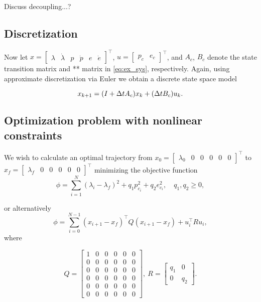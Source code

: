 Discuss decoupling...?

\subsection{Discretization}
Now let $x = \begin{bmatrix}\lambda&\dot{\lambda}&p&\dot{p}&e&\dot{e}\end{bmatrix}^\top$, $u = \begin{bmatrix}p_c&e_c\end{bmatrix}^\top$, and $A_c$, $B_c$ denote the state transition matrix and ** matrix in \eqref{eq:ex_sys}, respectively. Again, using approximate discretization via Euler we obtain a discrete state space model

\begin{equation}
	\label{eq:ex_dsys}
	x_{k+1} = (I + \Delta t A_c) x_k + (\Delta t B_c) u_k. \\
\end{equation}

\subsection{Optimization problem with nonlinear constraints}

We wish to calculate an optimal trajectory from $x_0 = \begin{bmatrix}\lambda_0&0&0&0&0&0\end{bmatrix}^\top$ to $x_f = \begin{bmatrix}\lambda_f&0&0&0&0&0\end{bmatrix}^\top$ minimizing the objective function 
\begin{equation*}
	\phi = \sum_{i=1}^{N}(\lambda_i - \lambda_f)^2 + q_1 p^2_{c_i} + q_2 e^2_{c_i}, \quad q_1,q_2 \ge 0,
\end{equation*}

or alternatively
\begin{equation}
	\label{eq:quad_cost}
	\phi = \sum_{i=0}^{N-1} (x_{i+1}-x_f)^\top Q(x_{i+1}-x_f) + u_i^\top R u_i,
\end{equation}
where

\begin{equation}
Q = \begin{bmatrix}1&0&0&0&0&0\\0&0&0&0&0&0\\0&0&0&0&0&0\\0&0&0&0&0&0\\0&0&0&0&0&0\\0&0&0&0&0&0\end{bmatrix}, \ R = \begin{bmatrix}q_1&0\\0&q_2\end{bmatrix}.
\end{equation}

